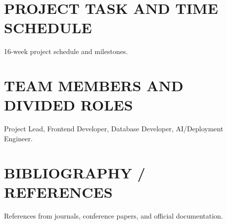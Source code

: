 \documentclass[12pt,a4paper]{report}
\begin{document}
\clearpage
\chapter{PROJECT TASK AND TIME SCHEDULE}
16-week project schedule and milestones.

\clearpage
\chapter{TEAM MEMBERS AND DIVIDED ROLES}
Project Lead, Frontend Developer, Database Developer, AI/Deployment Engineer.

\clearpage
\chapter*{BIBLIOGRAPHY / REFERENCES}
References from journals, conference papers, and official documentation.
\end{document}
